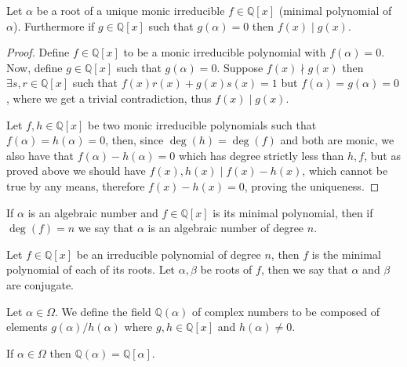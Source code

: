 \begin{proposition}
    Let \(\alpha\) be a root of a unique monic irreducible \(f \in
    \mathbb{Q}[x]\) (minimal polynomial of \(\alpha\)). Furthermore if \(g \in
    \mathbb{Q}[x]\) such that \(g(\alpha) = 0\) then \(f(x) \mid g(x)\).
\end{proposition}

\begin{proof}
    Define \(f \in \mathbb{Q}[x]\) to be a monic irreducible polynomial with
    \(f(\alpha) = 0\). Now, define \(g \in \mathbb{Q}[x]\) such that \(g(\alpha)
    = 0\). Suppose \(f(x) \nmid g(x)\) then \(\exists s, r \in \mathbb{Q}[x]\)
    such that \(f(x)r(x) + g(x)s(x) = 1\) but \(f(\alpha) = g(\alpha) = 0\),
    where we get a trivial contradiction, thus \(f(x) \mid g(x)\).

    Let \(f, h \in \mathbb{Q}[x]\) be two monic irreducible polynomials such that
    \(f(\alpha) = h(\alpha) = 0\), then, since \(\deg(h) = \deg(f)\) and both are
    monic, we also have that \(f(\alpha) - h(\alpha) = 0\) which has degree
    strictly less than \(h, f\), but as proved above we should have \(f(x), h(x)
    \mid f(x) - h(x)\), which cannot be true by any means, therefore  \(f(x) -
    h(x) = 0\), proving the uniqueness.
\end{proof}

\begin{definition}
    If \(\alpha\) is an algebraic number and \(f \in \mathbb{Q}[x]\) is its
    minimal polynomial, then if \(\deg(f) = n\) we say that \(\alpha\) is an
    algebraic number of degree \(n\).
\end{definition}

\begin{definition}[Conjugate]
    Let \(f \in \mathbb{Q}[x]\) be an irreducible polynomial of degree \(n\),
    then \(f\) is the minimal polynomial of each of its roots. Let \(\alpha,
    \beta\) be roots of \(f\), then we say that \(\alpha\) and \(\beta\) are
    conjugate.
\end{definition}

\begin{definition}
    Let \(\alpha \in \Omega\). We define the field \(\mathbb{Q}(\alpha)\) of
    complex numbers to be composed of elements \(g(\alpha)/h(\alpha)\) where
    \(g, h \in \mathbb{Q}[x]\) and \(h(\alpha) \neq 0\).
\end{definition}

\begin{proposition}
    If \(\alpha \in \Omega\) then \(\mathbb{Q}(\alpha) = \mathbb{Q}[\alpha]\).
\end{proposition}

